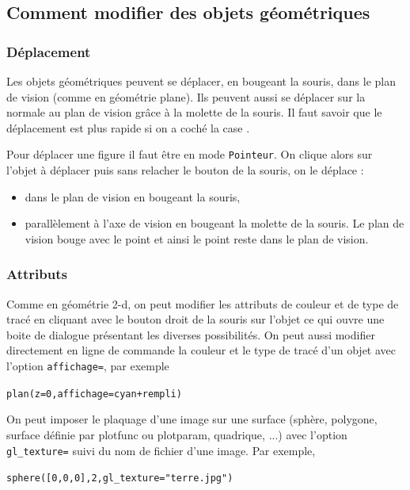 \documentclass[a4paper,11pt]{article}
\begin{document}
\subsection{Comment modifier des objets g\'eom\'etriques}
\index{$\sim$}
\subsubsection{D\'eplacement}
Les objets g\'eom\'etriques peuvent se d\'eplacer, en bougeant la souris, 
dans le plan de vision (comme en g\'eom\'etrie plane).  Ils peuvent aussi se 
d\'eplacer sur la normale au plan de vision gr\^ace \`a la molette de la 
souris. Il faut savoir que le d\'eplacement est plus rapide si on a coch\'e
la case \framebox{$\sim$}.
 
Pour d\'eplacer une figure il faut \^etre en mode {\tt Pointeur}.
On clique alors sur l'objet \`a d\'eplacer puis sans relacher le bouton de la 
souris, on le d\'eplace :
\begin{itemize}
\item dans le plan de vision en bougeant la souris,
\item parall\`element \`a l'axe de vision en bougeant la molette de la souris.
Le plan de vision bouge avec le point et ainsi le point reste dans le plan de 
vision.
\end{itemize}

\subsubsection{Attributs} \label{sec:attributs3d}
Comme en g\'eom\'etrie 2-d, on peut modifier les attributs de couleur et
de type de trac\'e en cliquant avec le bouton droit de la souris sur
l'objet ce qui ouvre une boite de dialogue pr\'esentant les diverses
possibilit\'es. On peut aussi modifier directement en ligne de commande
la couleur et le type de trac\'e d'un objet avec l'option
\verb|affichage=|, par exemple~
\begin{center}
\verb|plan(z=0,affichage=cyan+rempli)|
\end{center}
On peut imposer le plaquage d'une image sur une surface
(sph\`ere, polygone, surface d\'efinie par plotfunc ou plotparam,
quadrique, ...) avec l'option \verb|gl_texture=| suivi du nom de
fichier d'une image. Par exemple, 
\begin{center}
\verb|sphere([0,0,0],2,gl_texture="terre.jpg")|
\end{center}
\end{document}
